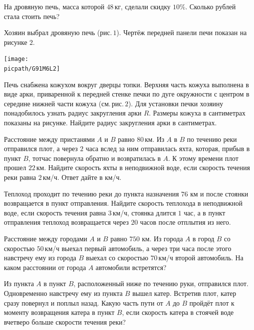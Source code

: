 \begin{class}[number=2]
\begin{listofex}
		\item На дровяную печь, масса которой \( 48 \) кг, сделали скидку \( 10\% \). Сколько рублей стала стоить печь?
		\item Хозяин выбрал дровяную печь (рис. \( 1 \)). Чертёж передней панели печи показан на рисунке \( 2 \).
		\begin{center}
			\texttt{[image: \\picpath/G91M6L2]}
		\end{center}
		Печь снабжена кожухом вокруг дверцы топки. Верхняя часть кожуха выполнена в виде арки, приваренной к передней стенке печки по дуге окружности с центром в середине нижней части кожуха (см. рис. \( 2 \)). Для установки печки хозяину понадобилось узнать радиус закругления арки \( R \). Размеры кожуха в сантиметрах показаны на рисунке. Найдите радиус закругления арки в сантиметрах.
		\item Расстояние между пристанями \( A \) и \( B \) равно \( 80 \) км. Из \( A \) в \( B \) по течению реки отправился плот, а через \( 2 \) часа вслед за ним отправилась яхта, которая, прибыв в пункт \( B \), тотчас повернула обратно и возвратилась в \( A \). К этому времени плот прошел \( 22 \) км. Найдите скорость яхты в неподвижной воде, если скорость течения реки равна \( 2 \) км/ч. Ответ дайте в км/ч.
		\item Теплоход проходит по течению реки до пункта назначения \( 76  \) км и после стоянки возвращается в пункт отправления. Найдите скорость теплохода в неподвижной воде, если скорость течения равна \( 3 \) км/ч, стоянка длится \( 1 \) час, а в пункт отправления теплоход возвращается через \( 20 \) часов после отплытия из него.
		\item Расстояние между городами \( A \) и \( B \) равно \( 750  \) км. Из города \( A \) в город \( B \) со скоростью \( 50 \) км/ч выехал первый автомобиль, а через три часа после этого навстречу ему из города \( B \) выехал со скоростью \( 70 \) км/ч второй автомобиль. На каком расстоянии от города \( A \) автомобили встретятся?
		\item Из пункта \( A \) в пункт \( B \), расположенный ниже по течению руки, отправился плот. Одновременно навстречу ему из пункта \( B \) вышел катер. Встретив плот, катер сразу повернул и поплыл назад. Какую часть пути от \( A \) до \( B \) пройдёт плот к моменту возвращения катера в пункт \( B \), если скорость катера в стоячей воде вчетверо больше скорости течения реки?	
	\end{listofex}
\end{class}

